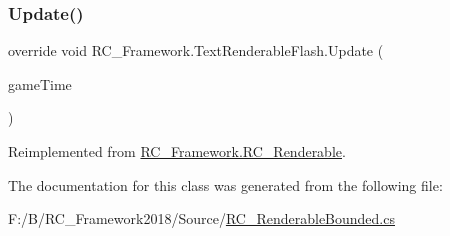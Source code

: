 \subsubsection{\texorpdfstring{Update()}{Update()}}
{\footnotesize\ttfamily override void R\+C\+\_\+\+Framework.\+Text\+Renderable\+Flash.\+Update (\begin{DoxyParamCaption}\item[{Game\+Time}]{game\+Time }\end{DoxyParamCaption})\hspace{0.3cm}{\ttfamily [virtual]}}



Reimplemented from \mbox{\hyperlink{class_r_c___framework_1_1_r_c___renderable_a5745bedc7ba0587aa1e1d8563c357228}{R\+C\+\_\+\+Framework.\+R\+C\+\_\+\+Renderable}}.



The documentation for this class was generated from the following file\+:\begin{DoxyCompactItemize}
\item 
F\+:/\+B/\+R\+C\+\_\+\+Framework2018/\+Source/\mbox{\hyperlink{_r_c___renderable_bounded_8cs}{R\+C\+\_\+\+Renderable\+Bounded.\+cs}}\end{DoxyCompactItemize}
